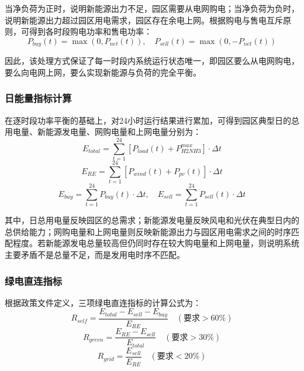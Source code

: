 当净负荷为正时，说明新能源出力不足，园区需要从电网购电；当净负荷为负时，说明新能源出力超过园区用电需求，园区存在余电上网。根据购电与售电互斥原则，可得到各时段购电功率和售电功率：
\begin{equation}
P_{buy}(t) = \max(0, P_{net}(t)), \quad P_{sell}(t) = \max(0, -P_{net}(t))
\end{equation}

因此，该处理方式保证了每一时段内系统运行状态唯一，即园区要么从电网购电，要么向电网上网，要么实现新能源与负荷的完全平衡。

\subsubsection{日能量指标计算}

在逐时段功率平衡的基础上，对24小时运行结果进行累加，可得到园区典型日的总用电量、新能源发电量、网购电量和上网电量分别为：
\begin{equation}
E_{total} = \sum_{t=1}^{24} [P_{load}(t) + P_{H2NH3}^{max}] \cdot \Delta t
\end{equation}
\begin{equation}
E_{RE} = \sum_{t=1}^{24} [P_{wind}(t) + P_{pv}(t)] \cdot \Delta t
\end{equation}
\begin{equation}
E_{buy} = \sum_{t=1}^{24} P_{buy}(t) \cdot \Delta t, \quad E_{sell} = \sum_{t=1}^{24} P_{sell}(t) \cdot \Delta t
\end{equation}

其中，日总用电量反映园区的总需求；新能源发电量反映风电和光伏在典型日内的总供给能力；网购电量和上网电量则反映新能源出力与园区用电需求之间的时序匹配程度。若新能源发电总量较高但仍同时存在较大购电量和上网电量，则说明系统主要矛盾不是总量不足，而是发用电时序不匹配。

\subsubsection{绿电直连指标}

根据政策文件定义，三项绿电直连指标的计算公式为：
\begin{equation}\label{eq:R_self}
R_{self} = \frac{E_{total} - E_{sell} - E_{buy}}{E_{RE}} \quad (\text{要求} > 60\%)
\end{equation}
\begin{equation}\label{eq:R_green}
R_{green} = \frac{E_{RE} - E_{sell}}{E_{total}} \quad (\text{要求} > 30\%)
\end{equation}
\begin{equation}\label{eq:R_grid}
R_{grid} = \frac{E_{sell}}{E_{RE}} \quad (\text{要求} < 20\%)
\end{equation}

